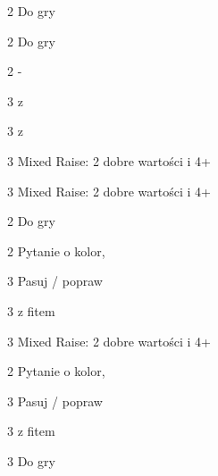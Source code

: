 \documentclass[12pt, a4paper]{article}
\begin{document}
\begin{compoptions}[4]
    \item[2\hearts] Do gry
    \item[2\spades] Do gry 
    \item[2\nt] -
    \item[3\clubs] \invp z \hearts \imp
    \item[3\diams] \invp z \spades \imp
    \item[3\hearts] Mixed Raise: 2 dobre wartości i 4+\hearts
    \item[3\spades] Mixed Raise: 2 dobre wartości i 4+\spades     
\end{compoptions}

\begin{compoptions}[4]
    \item[2\spades] Do gry 
    \item[2\nt] Pytanie o kolor, \invp \imp
    \item[3\clubs] Pasuj / popraw
    \item[3\diams] \invp z fitem \spades \vimp
    \item[3\spades] Mixed Raise: 2 dobre wartości i 4+\spades     
\end{compoptions}

\begin{compoptions}[4]
    \item[2\nt] Pytanie o kolor, \invp \imp
    \item[3\clubs] Pasuj / popraw
    \item[3\diams] \invp z fitem \hearts \vimp
    \item[3\hearts] Do gry
\end{compoptions}
\end{document}
